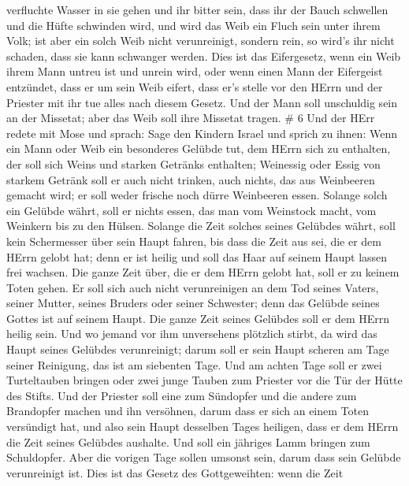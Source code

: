 verfluchte Wasser in sie gehen und ihr bitter sein, dass ihr der Bauch
schwellen und die Hüfte schwinden wird, und wird das Weib ein Fluch sein
unter ihrem Volk;  ist aber ein solch Weib nicht
verunreinigt, sondern rein, so wird's ihr nicht schaden, dass sie kann
schwanger werden.  Dies ist das Eifergesetz, wenn ein Weib
ihrem Mann untreu ist und unrein wird,  oder wenn einen
Mann der Eifergeist entzündet, dass er um sein Weib eifert, dass er's
stelle vor den HErrn und der Priester mit ihr tue alles nach diesem
Gesetz.  Und der Mann soll unschuldig sein an der Missetat;
aber das Weib soll ihre Missetat tragen. \# 6  Und der HErr
redete mit Mose und sprach:  Sage den Kindern Israel und
sprich zu ihnen: Wenn ein Mann oder Weib ein besonderes Gelübde tut, dem
HErrn sich zu enthalten,  der soll sich Weins und starken
Getränks enthalten; Weinessig oder Essig von starkem Getränk soll er
auch nicht trinken, auch nichts, das aus Weinbeeren gemacht wird; er
soll weder frische noch dürre Weinbeeren essen.  Solange
solch ein Gelübde währt, soll er nichts essen, das man vom Weinstock
macht, vom Weinkern bis zu den Hülsen.  Solange die Zeit
solches seines Gelübdes währt, soll kein Schermesser über sein Haupt
fahren, bis dass die Zeit aus sei, die er dem HErrn gelobt hat; denn er
ist heilig und soll das Haar auf seinem Haupt lassen frei wachsen.
 Die ganze Zeit über, die er dem HErrn gelobt hat, soll er
zu keinem Toten gehen.  Er soll sich auch nicht
verunreinigen an dem Tod seines Vaters, seiner Mutter, seines Bruders
oder seiner Schwester; denn das Gelübde seines Gottes ist auf seinem
Haupt.  Die ganze Zeit seines Gelübdes soll er dem HErrn
heilig sein.  Und wo jemand vor ihm unversehens plötzlich
stirbt, da wird das Haupt seines Gelübdes verunreinigt; darum soll er
sein Haupt scheren am Tage seiner Reinigung, das ist am siebenten Tage.
 Und am achten Tage soll er zwei Turteltauben bringen oder
zwei junge Tauben zum Priester vor die Tür der Hütte des Stifts.
 Und der Priester soll eine zum Sündopfer und die andere
zum Brandopfer machen und ihn versöhnen, darum dass er sich an einem
Toten versündigt hat, und also sein Haupt desselben Tages heiligen,
 dass er dem HErrn die Zeit seines Gelübdes aushalte. Und
soll ein jähriges Lamm bringen zum Schuldopfer. Aber die vorigen Tage
sollen umsonst sein, darum dass sein Gelübde verunreinigt ist.
 Dies ist das Gesetz des Gottgeweihten: wenn die Zeit
